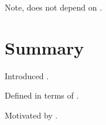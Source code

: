 \begin{note}
  Note, does not depend on .
\end{note}

\section*{Summary}

\begin{note}
  Introduced .

  Defined in terms of \tC{}.

  Motivated by \tC{}.
\end{note}











